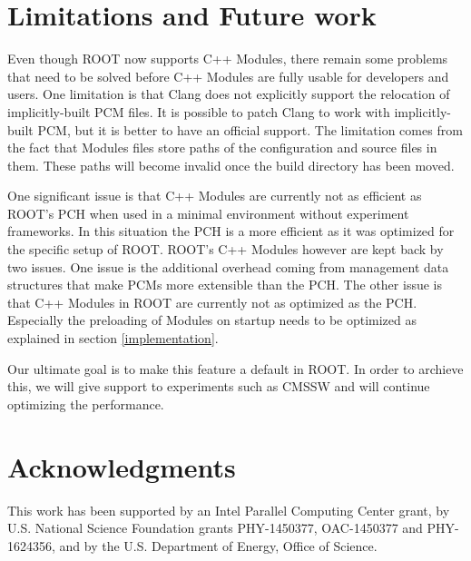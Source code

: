 \documentclass{webofc}
\begin{document}
\section{Limitations and Future work}
\label{limitationsandfuture}

Even though ROOT now supports C++ Modules, there remain some problems that need to be solved before C++ Modules are fully usable for developers and users. One limitation is that Clang does not explicitly support the relocation of implicitly-built PCM files. It is possible to patch Clang to work with implicitly-built PCM, but it is better to have an official support. The limitation comes from the fact that Modules files store paths of the configuration and source files in them. These paths will become invalid once the build directory has been moved.


One significant issue is that C++ Modules are currently not as efficient as ROOT's PCH when used in a minimal environment without experiment frameworks. In this situation the PCH is a more efficient as it was optimized for the specific setup of ROOT. ROOT's C++ Modules however are kept back by two issues. One issue is the additional overhead coming from management data structures that make PCMs more extensible than the PCH. The other issue is that C++ Modules in ROOT are currently not as optimized as the PCH. Especially the preloading of Modules on startup needs to be optimized as explained in section \ref{implementation}.

Our ultimate goal is to make this feature a default in ROOT. In order to archieve this, we will give support to experiments such as CMSSW and will continue optimizing the performance.

\section{Acknowledgments}

This work has been supported by an Intel Parallel Computing Center grant, by U.S. National Science Foundation grants PHY-1450377, OAC-1450377 and PHY-1624356, and by the U.S. Department of Energy, Office of Science.
\end{document}
